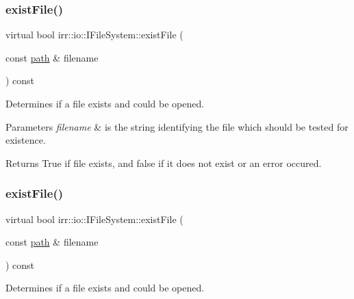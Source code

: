 \subsubsection{\texorpdfstring{exist\+File()}{existFile()}\hspace{0.1cm}{\footnotesize\ttfamily [1/2]}}
{\footnotesize\ttfamily virtual bool irr\+::io\+::\+I\+File\+System\+::exist\+File (\begin{DoxyParamCaption}\item[{const \hyperlink{namespaceirr_1_1io_a6468281622ce3a1c46b72e19f32dded5}{path} \&}]{filename }\end{DoxyParamCaption}) const\hspace{0.3cm}{\ttfamily [pure virtual]}}



Determines if a file exists and could be opened. 


\begin{DoxyParams}{Parameters}
{\em filename} & is the string identifying the file which should be tested for existence. \\
\hline
\end{DoxyParams}
\begin{DoxyReturn}{Returns}
True if file exists, and false if it does not exist or an error occured. 
\end{DoxyReturn}
\mbox{\label{classirr_1_1io_1_1IFileSystem_a1c5e98bc16e38b1d15b44e24b1b3bd32}} 
\subsubsection{\texorpdfstring{exist\+File()}{existFile()}\hspace{0.1cm}{\footnotesize\ttfamily [2/2]}}
{\footnotesize\ttfamily virtual bool irr\+::io\+::\+I\+File\+System\+::exist\+File (\begin{DoxyParamCaption}\item[{const \hyperlink{namespaceirr_1_1io_a6468281622ce3a1c46b72e19f32dded5}{path} \&}]{filename }\end{DoxyParamCaption}) const\hspace{0.3cm}{\ttfamily [pure virtual]}}



Determines if a file exists and could be opened. 


